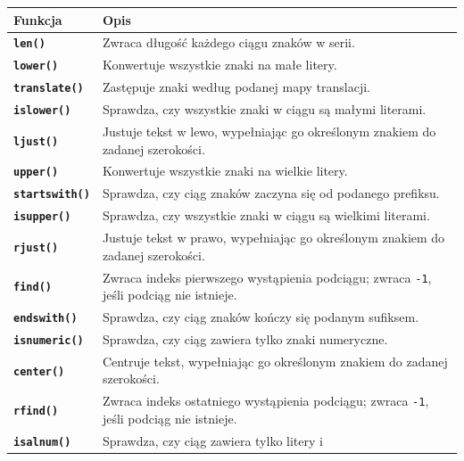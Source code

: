 \documentclass[
  polish,
  letterpaper,
  DIV=11,
  numbers=noendperiod]{scrreprt}
\begin{document}
\begin{longtable}[]{@{}
  >{\raggedright\arraybackslash}p{}
  >{\raggedright\arraybackslash}p{}@{}}
\toprule\noalign{}
\begin{minipage}[b]{\linewidth}\raggedright
Funkcja
\end{minipage} & \begin{minipage}[b]{\linewidth}\raggedright
Opis
\end{minipage} \\
\midrule\noalign{}
\endhead
\bottomrule\noalign{}
\endlastfoot
\textbf{\texttt{len()}} & Zwraca długość każdego ciągu znaków w
serii. \\
\textbf{\texttt{lower()}} & Konwertuje wszystkie znaki na małe
litery. \\
\textbf{\texttt{translate()}} & Zastępuje znaki według podanej mapy
translacji. \\
\textbf{\texttt{islower()}} & Sprawdza, czy wszystkie znaki w ciągu są
małymi literami. \\
\textbf{\texttt{ljust()}} & Justuje tekst w lewo, wypełniając go
określonym znakiem do zadanej szerokości. \\
\textbf{\texttt{upper()}} & Konwertuje wszystkie znaki na wielkie
litery. \\
\textbf{\texttt{startswith()}} & Sprawdza, czy ciąg znaków zaczyna się
od podanego prefiksu. \\
\textbf{\texttt{isupper()}} & Sprawdza, czy wszystkie znaki w ciągu są
wielkimi literami. \\
\textbf{\texttt{rjust()}} & Justuje tekst w prawo, wypełniając go
określonym znakiem do zadanej szerokości. \\
\textbf{\texttt{find()}} & Zwraca indeks pierwszego wystąpienia
podciągu; zwraca \texttt{-1}, jeśli podciąg nie istnieje. \\
\textbf{\texttt{endswith()}} & Sprawdza, czy ciąg znaków kończy się
podanym sufiksem. \\
\textbf{\texttt{isnumeric()}} & Sprawdza, czy ciąg zawiera tylko znaki
numeryczne. \\
\textbf{\texttt{center()}} & Centruje tekst, wypełniając go określonym
znakiem do zadanej szerokości. \\
\textbf{\texttt{rfind()}} & Zwraca indeks ostatniego wystąpienia
podciągu; zwraca \texttt{-1}, jeśli podciąg nie istnieje. \\
\textbf{\texttt{isalnum()}} & Sprawdza, czy ciąg zawiera tylko litery i

\end{longtable}
\end{document}
